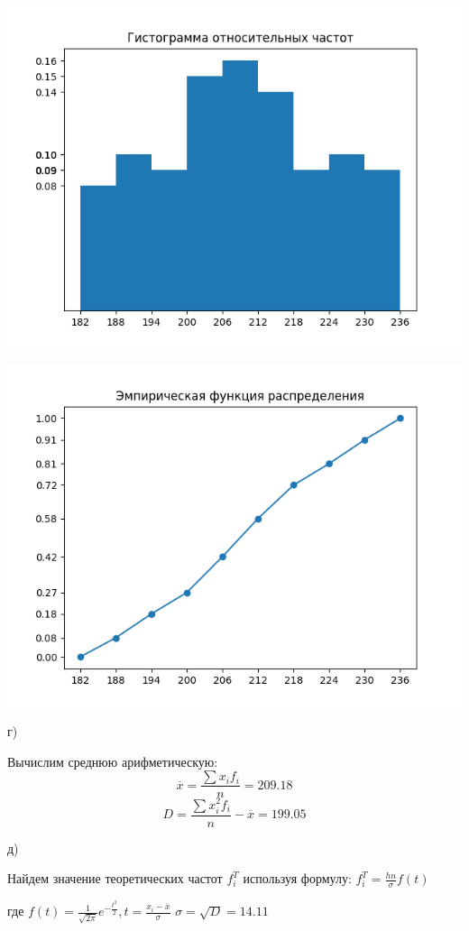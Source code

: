 \documentclass[10pt]{article}
\begin{document}
\centerline{\includegraphics[scale=0.7]{2.png}}

\centerline{\includegraphics[scale=0.7]{3.png}}

г)

Вычислим среднюю арифметическую:
\[\overline{x}=\frac{\sum x_i f_i}{n}=209.18\]
\[D=\frac{\sum x_i^2 f_i}{n} - \overline{x}=199.05\]

д)

Найдем значение теоретических частот $f_i^T$ используя формулу:
$f_i^T=\frac{hn}{\sigma}f(t)$

где $f(t)=\frac{1}{\sqrt{2\pi}}e^{-\frac{t^2}{2}}, t=\frac{x_i-\overline{x}}{\sigma}$
$\sigma=\sqrt{D}=14.11$
\end{document}
